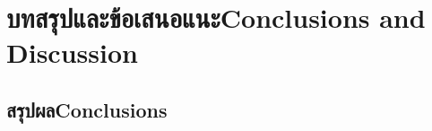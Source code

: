 \chapter{\ifcpe บทสรุปและข้อเสนอแนะ\else Conclusions and Discussion\fi}

\section{\ifcpe สรุปผล\else Conclusions\fi}
